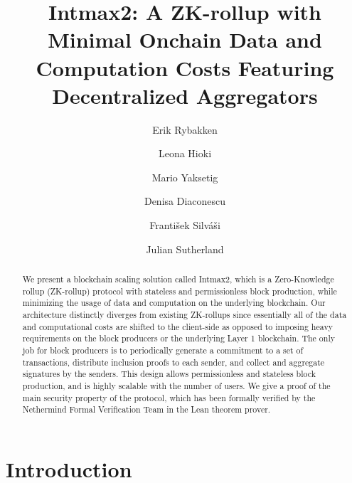 \documentclass[runningheads]{llncs}
\begin{document}
%
\title{
  Intmax2: A ZK-rollup with Minimal Onchain Data and Computation
  Costs Featuring Decentralized Aggregators
}
%
%
\author{
  Erik Rybakken
  \and
  Leona Hioki
  \and
  Mario Yaksetig
  \and
  Denisa Diaconescu
  \and
  František Silváši
  \and
  Julian Sutherland
}


%
\maketitle              %
%
\begin{abstract}
  We present a blockchain scaling solution called Intmax2, which is a
  Zero-Knowledge rollup (ZK-rollup) protocol with stateless and
  permissionless block production, while minimizing the usage of data
  and computation on the underlying blockchain. Our architecture
  distinctly diverges from existing ZK-rollups since essentially all
  of the data and computational costs are shifted to the client-side
  as opposed to imposing heavy requirements on the block producers or
  the underlying Layer 1 blockchain. The only job for block producers
  is to periodically generate a commitment to a set of transactions,
  distribute inclusion proofs to each sender, and collect and
  aggregate signatures by the senders. This design allows
  permissionless and stateless block production, and is highly
  scalable with the number of users. We give a proof of the main
  security property of the protocol, which has been formally verified
  by the Nethermind Formal Verification Team in the Lean theorem prover.
\end{abstract}
%
%
%

\section{Introduction}


%     
\end{document}
